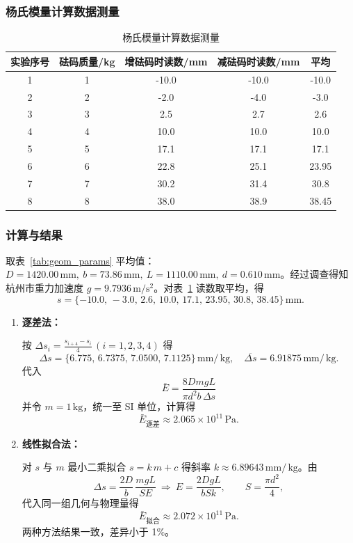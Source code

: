 \documentclass[]{../template/Report}%
\begin{document}
\begin{fullreportonly}
\subsubsection{杨氏模量计算数据测量}
\begin{table}[H]
    \centering
    \caption{杨氏模量计算数据测量}
    \label{tab:load_readings}
    \small
    \begin{tabular}{|c|c|c|c|c|}
        \hline
        实验序号 & 砝码质量/kg & 增砝码时读数/mm & 减砝码时读数/mm & 平均 \\
        \hline
        1 & 1 & -10.0 & -10.0 & -10.0 \\
        2 & 2 & -2.0 & -4.0 & -3.0 \\
        3 & 3 & 2.5 & 2.7 & 2.6 \\
        4 & 4 & 10.0 & 10.0 & 10.0 \\
        5 & 5 & 17.1 & 17.1 & 17.1 \\
        6 & 6 & 22.8 & 25.1 & 23.95 \\
        7 & 7 & 30.2 & 31.4 & 30.8 \\
        8 & 8 & 38.0 & 38.9 & 38.45 \\
        \hline
    \end{tabular}
\end{table}

\subsubsection{计算与结果}
取表~\ref{tab:geom_params} 平均值：\(D=1420.00\,\mathrm{mm},\ b=73.86\,\mathrm{mm},\ L=1110.00\,\mathrm{mm},\ d=0.610\,\mathrm{mm}\)。经过调查得知杭州市重力加速度 \(g=9.7936\,\mathrm{m/s^2}\)。对表~\ref{tab:load_readings} 读数取平均，得
\[s=\{-10.0,\,-3.0,\,2.6,\,10.0,\,17.1,\,23.95,\,30.8,\,38.45\}\,\mathrm{mm} .\]

\begin{enumerate}[label=(\arabic*)]
\item \textbf{逐差法：}

按 \(\Delta s_i=\frac{s_{i+4}-s_i}{4}\,(i=1,2,3,4)\) 得
\[\Delta s=\{6.775,\,6.7375,\,7.0500,\,7.1125\}\,\mathrm{mm/\,kg},\quad \overline{\Delta s}=6.91875\,\mathrm{mm/\,kg}.\]
代入
\[\bar{E}=\frac{8DmgL}{\pi d^2 b\,\Delta s}\]
并令 \(m=1\,\mathrm{kg}\)，统一至 SI 单位，计算得
\[\boxed{\bar{E}_{\text{逐差}}\approx 2.065\times10^{11}\,\mathrm{Pa} }.\]

\item \textbf{线性拟合法：}

对 \(s\) 与 \(m\) 最小二乘拟合 \(s=k\,m+c\) 得斜率 \(k\approx 6.89643\,\mathrm{mm/\,kg}\)。由
\[\Delta s=\frac{2D}{b}\,\frac{m g L}{S E}\ \Rightarrow\ E=\frac{2D g L}{b S k},\qquad S=\frac{\pi d^2}{4},\]
代入同一组几何与物理量得
\[\boxed{\bar{E}_{\text{拟合}}\approx 2.072\times10^{11}\,\mathrm{Pa} }.\]
两种方法结果一致，差异小于 1\%。


\end{enumerate}
\end{fullreportonly}
\end{document}
